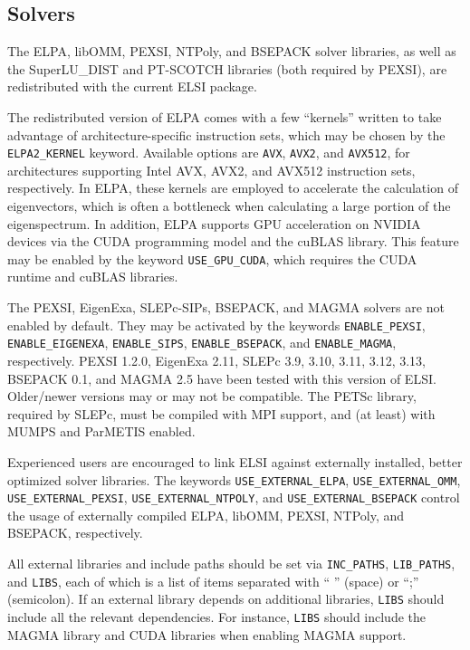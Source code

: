 \documentclass{report}
\begin{document}
\subsection{Solvers}
\label{subsec:config_solvers}
The ELPA, libOMM, PEXSI, NTPoly, and BSEPACK solver libraries, as well as the SuperLU\_DIST and PT-SCOTCH libraries (both required by PEXSI), are redistributed with the current ELSI package.

The redistributed version of ELPA comes with a few ``kernels'' written to take advantage of architecture-specific instruction sets, which may be chosen by the \texttt{ELPA2\_KERNEL} keyword. Available options are \texttt{AVX}, \texttt{AVX2}, and \texttt{AVX512}, for architectures supporting Intel AVX, AVX2, and AVX512 instruction sets, respectively. In ELPA, these kernels are employed to accelerate the calculation of eigenvectors, which is often a bottleneck when calculating a large portion of the eigenspectrum. In addition, ELPA supports GPU acceleration on NVIDIA devices via the CUDA programming model and the cuBLAS library. This feature may be enabled by the keyword \texttt{USE\_GPU\_CUDA}, which requires the CUDA runtime and cuBLAS libraries.

The PEXSI, EigenExa, SLEPc-SIPs, BSEPACK, and MAGMA solvers are not enabled by default. They may be activated by the keywords \texttt{ENABLE\_PEXSI}, \texttt{ENABLE\_EIGENEXA}, \texttt{ENABLE\_SIPS}, \texttt{ENABLE\_BSEPACK}, and \texttt{ENABLE\_MAGMA}, respectively. PEXSI 1.2.0, EigenExa 2.11, SLEPc 3.9, 3.10, 3.11, 3.12, 3.13, BSEPACK 0.1, and MAGMA 2.5 have been tested with this version of ELSI. Older/newer versions may or may not be compatible. The PETSc library, required by SLEPc, must be compiled with MPI support, and (at least) with MUMPS and ParMETIS enabled.

Experienced users are encouraged to link ELSI against externally installed, better optimized solver libraries. The keywords \texttt{USE\_EXTERNAL\_ELPA}, \texttt{USE\_EXTERNAL\_OMM}, \texttt{USE\_EXTERNAL\_PEXSI}, \texttt{USE\_EXTERNAL\_NTPOLY}, and \texttt{USE\_EXTERNAL\_BSEPACK} control the usage of externally compiled ELPA, libOMM, PEXSI, NTPoly, and BSEPACK, respectively.

All external libraries and include paths should be set via \texttt{INC\_PATHS}, \texttt{LIB\_PATHS}, and \texttt{LIBS}, each of which is a list of items separated with `` '' (space) or ``;'' (semicolon). If an external library depends on additional libraries, \texttt{LIBS} should include all the relevant dependencies. For instance, \texttt{LIBS} should include the MAGMA library and CUDA libraries when enabling MAGMA support.
\end{document}
